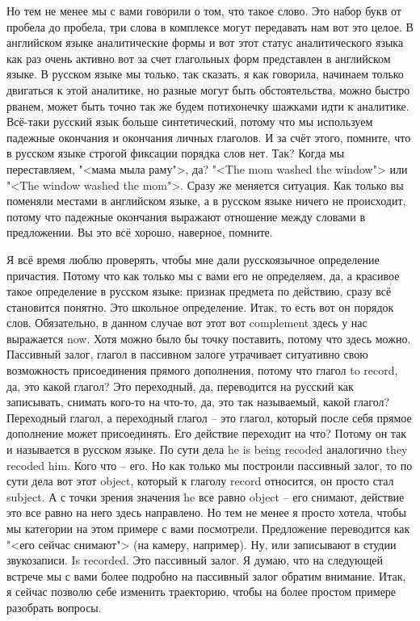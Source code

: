 \documentclass[main.tex]{subfiles}
\begin{document}
Но тем не менее мы с вами говорили о том, что такое слово.
Это набор букв от пробела до пробела, три слова в комплексе могут передавать нам вот это целое.
В английском языке аналитические формы и вот этот статус аналитического языка как раз очень активно вот за счет глагольных форм представлен в английском языке.
В русском языке мы только, так сказать, я как говорила, начинаем только двигаться к этой аналитике, но разные могут быть обстоятельства, можно быстро рванем, может быть точно так же будем потихонечку шажками идти к аналитике.
Всё-таки русский язык больше синтетический, потому что мы используем падежные окончания и окончания личных глаголов.
И за счёт этого, помните, что в русском языке строгой фиксации порядка слов нет.
Так?
Когда мы переставляем, "<мама мыла раму">, да?
"<The mom washed the window"> или "<The window washed the mom">.
Сразу же меняется ситуация.
Как только вы поменяли местами в английском языке, а в русском языке ничего не происходит, потому что падежные окончания выражают отношение между словами в предложении.
Вы это всё хорошо, наверное, помните.

Я всё время люблю проверять, чтобы мне дали русскоязычное определение причастия.
Потому что как только мы с вами его не определяем, да, а красивое такое определение в русском языке: признак предмета по действию, сразу всё становится понятно.
Это школьное определение.
Итак, то есть вот он порядок слов.
Обязательно, в данном случае вот этот вот complement здесь у нас выражается now.
Хотя можно было бы точку поставить, потому что здесь можно.
Пассивный залог, глагол в пассивном залоге утрачивает ситуативно свою возможность присоединения прямого дополнения, потому что глагол to record, да, это какой глагол?
Это переходный, да, переводится на русский как записывать, снимать кого-то на что-то, да, это так называемый, какой глагол?
Переходный глагол, а переходный глагол -- это глагол, который после себя прямое дополнение может присоединять.
Его действие переходит на что? Потому он так и называется в русском языке.
По сути дела he is being recoded аналогично they recoded him.
Кого что -- его.
Но как только мы построили пассивный залог, то по сути дела вот этот object, который к глаголу record относится, он просто стал subject.
А с точки зрения значения he все равно object -- его снимают, действие это все равно на него здесь направлено.
Но тем не менее я просто хотела, чтобы мы категории на этом примере с вами посмотрели.
Предложение переводится как "<его сейчас снимают"> (на камеру, например).
Ну, или записывают в студии звукозаписи.
Is recorded.
Это пассивный залог.
Я думаю, что на следующей встрече мы с вами более подробно на пассивный залог обратим внимание.
Итак, я сейчас позволю себе изменить траекторию, чтобы на более простом примере разобрать вопросы.
\end{document}
